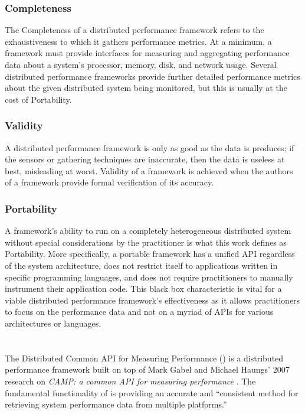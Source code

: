 \subsubsection{Completeness}

The Completeness of a distributed performance framework refers to the exhaustiveness to which it gathers performance
metrics. At a minimum, a framework must provide interfaces for measuring and aggregating performance data about a
system's processor, memory, disk, and network usage. Several distributed performance frameworks provide further detailed
performance metrics about the given distributed system being monitored, but this is usually at the cost of Portability.

\subsubsection{Validity}

A distributed performance framework is only as good as the data is produces; if the sensors or gathering techniques are
inaccurate, then the data is useless at best, misleading at worst. Validity of a framework is achieved when the authors
of a framework provide formal verification of its accuracy.

\subsubsection{Portability}

A framework's ability to run on a completely heterogeneous distributed system without special considerations by the
practitioner is what this work defines as Portability. More specifically, a portable framework has a unified API
regardless of the system architecture, does not restrict itself to applications written in specific programming
languages, and does not require practitioners to manually instrument their application code. This black box
characteristic is vital for a viable distributed performance framework's effectiveness as it allows practitioners to
focus on the performance data and not on a myriad of APIs for various architectures or languages.

\section{\dcamp}
\label{dcamp}

The Distributed Common API for Measuring Performance (\dcampns) is a distributed performance framework built on top of
Mark Gabel and Michael Haungs' 2007 research on \emph{CAMP: a common API for measuring performance} \cite{gabel2007}.
The fundamental functionality of \camp is providing an accurate and ``consistent method for retrieving system
performance data from multiple platforms.''

